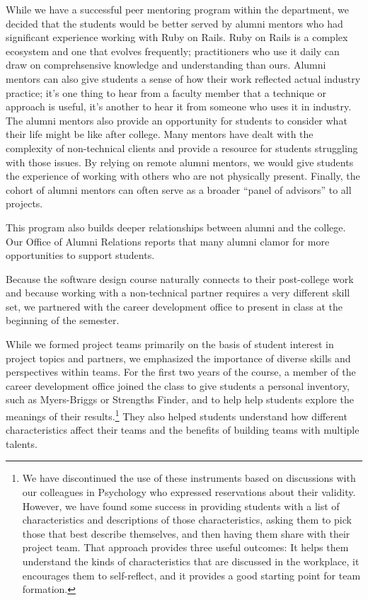 While we have a successful peer mentoring program within the department,
we decided that the students would be better served by alumni mentors
who had significant experience working with Ruby on Rails.
Ruby on Rails is a complex ecosystem and one that evolves
frequently; practitioners who use it daily can draw on
comprehsensive knowledge and understanding than ours.  Alumni mentors
can also give students a sense of how their work
reflected actual industry practice; it's one thing to hear from a
faculty member that a technique or approach is useful, it's another
to hear it from someone who uses it in industry.  The
alumni mentors also provide an opportunity for students to consider
what their life might be like after college.  Many mentors have
dealt with the complexity of non-technical clients and provide a
resource for students struggling with those issues.  By relying on
remote alumni mentors, we would give students the experience of
working with others who are not physically present.  Finally, the
cohort of alumni mentors can often serve as a broader ``panel of
advisors'' to all projects.

This program also builds deeper relationships between
alumni and the college.  Our Office of Alumni Relations reports
that many alumni clamor for more opportunities to support
students.

Because the software design course naturally connects to their
post-college work and because working with a non-technical partner
requires a very different skill set, we partnered with the
career development office to present in class at the beginning of
the semester.

While we formed project teams primarily on the basis of student interest in 
project topics and partners, we
emphasized the importance of diverse skills and perspectives within teams.
For the first two years of the course, a member of the career 
development office joined the class to give students a personal 
inventory, such as Myers-Briggs or Strengths Finder, and to help
help students explore the meanings of their 
results.\footnote{We have discontinued the use of
these instruments based on discussions with our colleagues in
Psychology who expressed reservations about their validity.  However,
we have found some success in providing
students with a list of characteristics and descriptions of those
characteristics, asking them to pick those that
best describe themselves, and then having them share with their project
team.  That approach provides three useful outcomes:
It helps them understand the kinds of characteristics that are discussed
in the workplace, it encourages them to self-reflect, and it provides
a good starting point for team formation.}
They also helped students understand how different
characteristics affect their teams and the benefits of building
teams with multiple talents.

